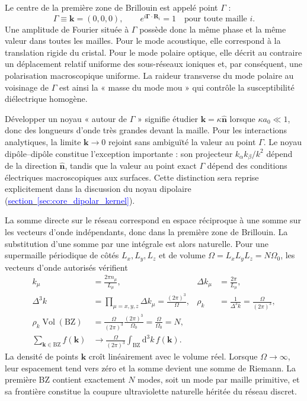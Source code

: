 Le centre de la première zone de Brillouin est appelé point $\Gamma$ :
\begin{equation}
\Gamma\equiv\mathbf k=(0,0,0),
\qquad e^{i\boldsymbol\Gamma\cdot\mathbf R_i}=1
\quad\text{pour toute maille $i$.}
\label{eq:core_gamma_definition}
\end{equation}
Une amplitude de Fourier située à $\Gamma$ possède donc la même phase et la
même valeur dans toutes les mailles. Pour le mode acoustique, elle correspond
à la translation rigide du cristal. Pour le mode polaire optique, elle décrit
au contraire un déplacement relatif uniforme des sous-réseaux ioniques et,
par conséquent, une polarisation macroscopique uniforme. La raideur transverse
du mode polaire au voisinage de $\Gamma$ est ainsi la « masse du mode mou »
qui contrôle la susceptibilité diélectrique homogène.

Développer un noyau « autour de $\Gamma$ » signifie étudier
$\mathbf k=\kappa\widehat{\mathbf n}$ lorsque $\kappa a_0\ll1$, donc des
longueurs d'onde très grandes devant la maille. Pour les interactions
analytiques, la limite $\mathbf k\to0$ rejoint sans ambiguïté la valeur au point
$\Gamma$. Le noyau dipôle--dipôle constitue l'exception importante : son
projecteur $k_\alpha k_\beta/k^2$ dépend de la direction
$\widehat{\mathbf n}$, tandis que la valeur au point exact $\Gamma$ dépend des
conditions électriques macroscopiques aux surfaces. Cette distinction sera
reprise explicitement dans la discussion du noyau dipolaire
(\hyperref[sec:core_dipolar_kernel]{\textcolor{blue}{section~\ref*{sec:core_dipolar_kernel}}}).

La somme directe sur le réseau correspond en espace réciproque à une somme sur les
vecteurs d'onde indépendants, donc dans la première zone de Brillouin.
\label{par:core_sum_to_integral}
La substitution d'une somme par une intégrale est alors naturelle. Pour une
supermaille périodique de côtés $L_x,L_y,L_z$ et de volume
$\Omega=L_xL_yL_z=N\Omega_0$, les vecteurs d'onde autorisés vérifient
\begin{equation}
\begin{aligned}
k_\mu&=\frac{2\pi n_\mu}{L_\mu},
&\Delta k_\mu&=\frac{2\pi}{L_\mu},\\
\Delta^3k&=\prod_{\mu=x,y,z}\Delta k_\mu
=\frac{(2\pi)^3}{\Omega},
&\rho_k&=\frac{1}{\Delta^3k}=\frac{\Omega}{(2\pi)^3},\\
\rho_k\operatorname{Vol}(\mathrm{BZ})
&=\frac{\Omega}{(2\pi)^3}\frac{(2\pi)^3}{\Omega_0}
=\frac{\Omega}{\Omega_0}=N,\\
\sum_{\mathbf k\in\mathrm{BZ}}f(\mathbf k)
&\longrightarrow\frac{\Omega}{(2\pi)^3}
\int_{\mathrm{BZ}}\mathrm d^3k\,f(\mathbf k).
\end{aligned}
\label{eq:core_k_state_density}
\end{equation}
La densité de points $\mathbf k$ croît linéairement avec le volume réel.
Lorsque $\Omega\to\infty$, leur espacement tend vers zéro et la somme devient
une somme de Riemann. La première BZ contient exactement $N$ modes, soit un
mode par maille primitive, et sa frontière constitue la coupure ultraviolette
naturelle héritée du réseau discret.

